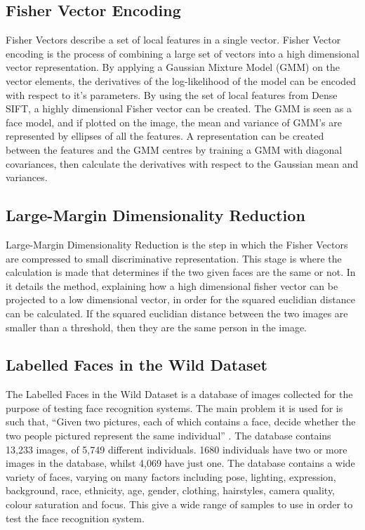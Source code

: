 \documentclass[12pt, a4paper]{article}
\begin{document}
\subsection{Fisher Vector Encoding}
Fisher Vectors describe a set of local features in a single vector. Fisher Vector encoding is the process of combining a large set of vectors into a high dimensional vector representation. By applying a Gaussian Mixture Model (GMM) on the vector elements, the derivatives of the log-likelihood of the model can be encoded with respect to it’s parameters. By using the set of local features from Dense SIFT, a highly dimensional Fisher vector can be created. The GMM is seen as a face model, and if plotted on the image, the mean and variance of GMM’s are represented by ellipses of all the features. A representation can be created between the features and the GMM centres by training a GMM with diagonal covariances, then calculate the derivatives with respect to the Gaussian mean and variances.

\subsection{Large-Margin Dimensionality Reduction}

Large-Margin Dimensionality Reduction is the step in which the Fisher Vectors are compressed to small discriminative representation. This stage is where the calculation is made that determines if the two given faces are the same or not. In \cite{simonyan2004fisher} it details the method, explaining how a high dimensional fisher vector can be projected to a low dimensional vector, in order for the squared euclidian distance can be calculated. If the squared euclidian distance between the two images are smaller than a threshold, then they are the same person in the image.
        
  \subsection{Labelled Faces in the Wild Dataset}

The Labelled Faces in the Wild Dataset is a database of images collected for the purpose of testing face recognition systems. The main problem it is used for is such that, “Given two pictures, each of which contains a face, decide whether the two people pictured represent the same individual” \cite{labelledFaces}. The database contains 13,233 images, of 5,749 different individuals. 1680 individuals have two or more images in the database, whilst 4,069 have just one. The database contains a wide variety of faces, varying on many factors including pose, lighting, expression, background, race, ethnicity, age, gender, clothing, hairstyles, camera quality, colour saturation and focus. This give a wide range of samples to use in order to test the face recognition system.
\end{document}
